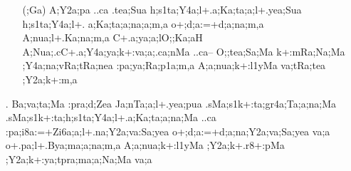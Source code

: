 \begin{itemize}
\begin{itemize}
               \item[({\sktf ;Ga})] {\sktf A;Y2a;pa ..ca .tea;Sua
h;s1ta;Y4a;l+.a;Ka;ta;a;l+.yea;Sua h;s1ta;Y4a;l+.%
a;Ka;ta;a;na;a;m,a o+;d;a:=+d;a;na;m,a\ZF{,}
A;nua;l+.Ka;na;m,a\ZF{,} C+.a;ya;a;lO;;Ka;aH\ZF{,} A;Nua;.cC+.a;Y4a;ya;k+:va;a;.ca;nMa ..ca}{\rm--}{\sktf
O;;tea;Sa;Ma k+:mRa;Na;Ma ;Y4a;na;vRa;tRa;nea :pa;ya;Ra;p1a;m,a
A;a;nua;k+:l1yMa va;tRa;tea ;Y2a;k+:m,a }
               \end{itemize}

\item[{\sktf 26}.] {\sktf Ba;va;ta;Ma :pra;d;Zea Ja;nTa;a;l+.yea;pua
.sMa;s1k+:ta;gr4a;Ta;a;na;Ma .sMa;s1k+:ta;h;s1ta;Y4a;l+.a;Ka;ta;a;na;Ma ..ca
:pa;i8a:=+Zi6a;a;l+.na;Y2a;va:Sa;yea o+;d;a:=+d;a;na;Y2a;va;Sa;yea va;a o+.pa;l+.Bya;ma;a;na;m,a
A;a;nua;k+:l1yMa ;Y2a;k+.r8+:pMa
;Y2a;k+:ya;tpra;ma;a;Na;Ma va;a}
\end{itemize}


